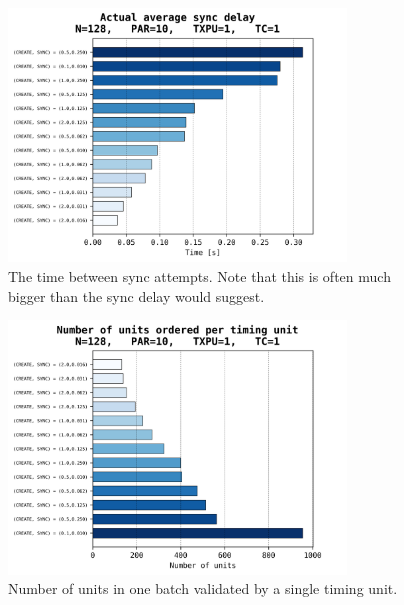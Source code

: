 \documentclass[a4paper,10pt]{article}
\begin{document}
			\begin{figure}[h]
				\centering
				\includegraphics[width=0.8\textwidth]{bar_plots/final_exp1/sync_delay.png}
				\caption{The time between sync attempts. Note that this is often much bigger than the sync delay would suggest.}
				\label{fig:delaysSyncDelay}
			\end{figure}
			\begin{figure}[h]
				\centering
				\includegraphics[width=0.8\textwidth]{bar_plots/final_exp1/n_units_decision.png}
				\caption{Number of units in one batch validated by a single timing unit.}
				\label{fig:nUnitsOrdered}
			\end{figure}
\end{document}
